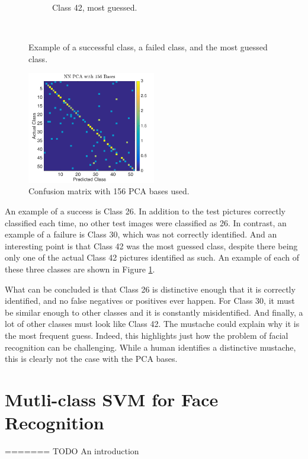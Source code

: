\documentclass[a4paper, 10pt, conference]{ieeeconf}
\begin{document}
\begin{figure}[!ht]
\begin{subfigure}{0.125\textwidth}
          \caption{Class 42, most guessed.}
        \end{subfigure}
        ~
	\caption{Example of a successful class, a failed class, and the most guessed class. }
  \label{fig:classpics}
\end{figure}

\begin{figure}[!ht]
    \centering
    \includegraphics[width=0.5\textwidth]{src/confusepca.png}
    \caption{Confusion matrix with 156 PCA bases used.}
    \label{fig:confusepca}
\end{figure}

An example of a success is Class 26. In addition to the test pictures correctly classified each time, no other test images were classified as 26. In contrast, an example of a failure is Class 30, which was not correctly identified. And an interesting point is that Class 42 was the most guessed class, despite there being only one of the actual Class 42 pictures identified as such. An example of each of these three classes are shown in Figure \ref{fig:classpics}.

What can be concluded is that Class 26 is distinctive enough that it is correctly identified, and no false negatives or positives ever happen. For Class 30, it must be similar enough to other classes and it is constantly misidentified. And finally, a lot of other classes must look like Class 42. The mustache could explain why it is the most frequent guess. Indeed, this highlights just how the problem of facial recognition can be challenging. While a human identifies a distinctive mustache, this is clearly not the case with the PCA bases.

\section{Mutli-class SVM for Face Recognition}
=======
TODO An introduction

\end{document}
